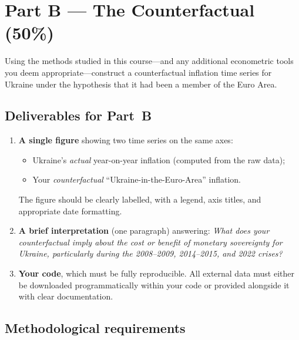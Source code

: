 \documentclass[11pt,a4paper]{article}
\begin{document}
\section*{Part B --- The Counterfactual (50\%)}

Using the methods studied in this course---and any additional econometric tools
you deem appropriate---construct a counterfactual inflation time series for
Ukraine under the hypothesis that it had been a member of the Euro Area.

\subsection*{Deliverables for Part~B}

\begin{enumerate}[label=\textbf{\arabic*.}, leftmargin=2em]

  \item \textbf{A single figure} showing two time series on the same axes:
  \begin{itemize}
    \item Ukraine's \emph{actual} year-on-year inflation (computed from the raw data);
    \item Your \emph{counterfactual} ``Ukraine-in-the-Euro-Area'' inflation.
  \end{itemize}
  The figure should be clearly labelled, with a legend, axis titles, and
  appropriate date formatting.

  \item \textbf{A brief interpretation} (one paragraph) answering: \emph{What
  does your counterfactual imply about the cost or benefit of monetary
  sovereignty for Ukraine, particularly during the 2008--2009, 2014--2015, and
  2022 crises?}

  \item \textbf{Your code}, which must be fully reproducible. All external data
  must either be downloaded programmatically within your code or provided
  alongside it with clear documentation.

\end{enumerate}

\subsection*{Methodological requirements}
\end{document}
